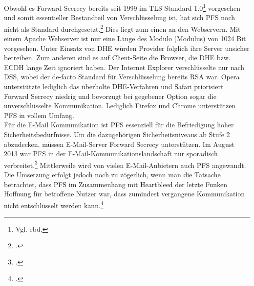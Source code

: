 \documentclass  [paper=a4,
				fontsize=12pt,
				listof=totoc,
				bibliography=totoc
				]{scrreprt}
\begin{document}
				Obwohl es Forward Secrecy bereits seit 1999 im \ac{TLS} Standard 1.0\footnote{Vgl. ebd.} vorgesehen und somit essentieller Bestandteil von Verschlüsselung ist, hat sich \ac{PFS} noch nicht als Standard durchgesetzt.\footcite[Vgl.][]{SSLLabs} Dies liegt zum einen an den Webservern. Mit einem Apache Webserver ist nur eine Länge des Modulo (Modulus) von 1024 Bit vorgesehen.\newpage
				Unter Einsatz von \ac{DHE} würden Provider folglich ihre Server unsicher betreiben. Zum anderen sind es auf Client-Seite die Browser, die \ac{DHE} bzw. \ac{ECDH} lange Zeit ignoriert haben. Der Internet Explorer verschlüsselte nur nach \ac{DSS}, wobei der de-facto Standard für Verschlüsselung bereits \ac{RSA} war. Opera unterstützte lediglich das überholte \ac{DHE}-Verfahren und Safari priorisiert Forward Secrecy niedrig und bevorzugt bei gegebener Option sogar die unverschlüsselte Kommunikation. Lediglich Firefox und Chrome unterstützen \ac{PFS} in vollem Umfang.\medskip\\
				Für die E-Mail Kommunikation ist \ac{PFS} essenziell für die Befriedigung hoher Sicherheitsbedürfnisse. Um die dazugehörigen Sicherheitsniveaus ab Stufe 2 abzudecken, müssen E-Mail-Server Forward Secrecy unterstützen. Im August 2013 war \ac{PFS} in der E-Mail-Kommunikationslandschaft nur sporadisch verbreitet.\footcite[Vgl.][]{Schulz2014} Mittlerweile wird von vielen E-Mail-Anbietern auch \ac{PFS} angewandt. Die Umsetzung erfolgt jedoch noch zu zögerlich, wenn man die Tatsache betrachtet, dass \ac{PFS} im Zusammenhang mit Heartbleed der letzte Funken Hoffnung für betroffene Nutzer war, dass zumindest vergangene Kommunikation nicht entschlüsselt werden kann.\footcite[Vgl.][]{Zhu2014}
		
\end{document}
